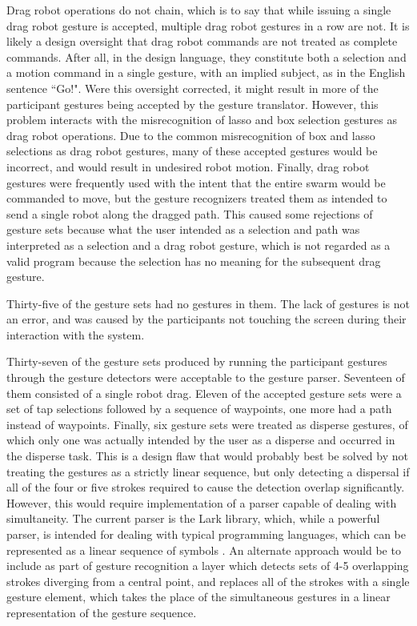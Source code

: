 Drag robot operations do not chain, which is to say that while issuing a single drag robot gesture is accepted, multiple drag robot gestures in a row are not. 
It is likely a design oversight that drag robot commands are not treated as complete commands. 
After all, in the design language, they constitute both a selection and a motion command in a single gesture, with an implied subject, as in the English sentence ``Go!". 
Were this oversight corrected, it might result in more of the participant gestures being accepted by the gesture translator. 
However, this problem interacts with the misrecognition of lasso and box selection gestures as drag robot operations. 
Due to the common misrecognition of box and lasso selections as drag robot gestures, many of these accepted gestures would be incorrect, and would result in undesired robot motion. 
Finally, drag robot gestures were frequently used with the intent that the entire swarm would be commanded to move, but the gesture recognizers treated them as intended to send a single robot along the dragged path. 
This caused some rejections of gesture sets because what the user intended as a selection and path was interpreted as a selection and a drag robot gesture, which is not regarded as a valid program because the selection has no meaning for the subsequent drag gesture. 

Thirty-five of the gesture sets had no gestures in them. The lack of gestures is not an error, and was caused by the participants not touching the screen during their interaction with the system. 

Thirty-seven of the gesture sets produced by running the participant gestures through the gesture detectors were acceptable to the gesture parser. 
Seventeen of them consisted of a single robot drag. 
Eleven of the accepted gesture sets were a set of tap selections followed by a sequence of waypoints, one more had a path instead of waypoints. 
Finally, six gesture sets were treated as disperse gestures, of which only one was actually intended by the user as a disperse and occurred in the disperse task. 
This is a design flaw that would probably best be solved by not treating the gestures as a strictly linear sequence, but only detecting a dispersal if all of the four or five strokes required to cause the detection overlap significantly. 
However, this would require implementation of a parser capable of dealing with simultaneity. 
The current parser is the Lark library, which, while a powerful parser, is intended for dealing with typical programming languages, which can be represented as a linear sequence of symbols \citep{LarkParser}. 
An alternate approach would be to include as part of gesture recognition a layer which detects sets of 4-5 overlapping strokes diverging from a central point, and replaces all of the strokes with a single gesture element, which takes the place of the simultaneous gestures in a linear representation of the gesture sequence. 

